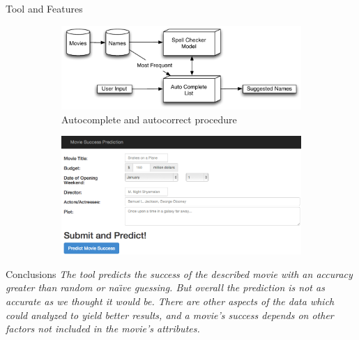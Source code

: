 \documentclass[final,table]{beamer}
\newlength{\twocolwid}
\begin{document}
\begin{frame}[t]
\begin{columns}[t]
\begin{column}{\twocolwid}
\begin{block}{Tool and Features}
\begin{figure}\hspace{-10ex}
	\begin{subfigure}[b]{0.2\textwidth}
          \includegraphics[width=40ex]{nameFig.pdf}
          \caption{Autocomplete and autocorrect procedure}
          \end{subfigure}\hspace{30ex}
          \begin{subfigure}[b]{0.2\textwidth}
          \includegraphics[width=40ex]{toolSS.png}
          \end{subfigure}
\end{figure}

\end{block}

\begin{block}{Conclusions}
\emph{The tool predicts the success of the described movie with an accuracy greater than random or na\"{\i}ve guessing. But overall the prediction is not as accurate as we thought it would be. There are other aspects of the data which could analyzed to yield better results, and a movie's success depends on other factors not included in the movie's attributes.}
\end{block}


\end{column}
\end{columns} %
\end{frame} %
\end{document}
